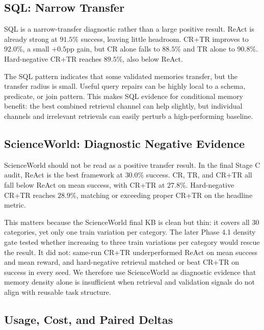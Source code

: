 \subsection{SQL: Narrow Transfer}
\label{sec:results-sql}

SQL is a narrow-transfer diagnostic rather than a large positive result.
ReAct is already strong at $91.5\%$ success, leaving little headroom.
CR+TR improves to $92.0\%$, a small $+0.5$pp gain, but CR alone falls to $88.5\%$ and TR alone to $90.8\%$.
Hard-negative CR+TR reaches $89.5\%$, also below ReAct.

The SQL pattern indicates that some validated memories transfer, but the transfer radius is small.
Useful query repairs can be highly local to a schema, predicate, or join pattern.
This makes SQL evidence for conditional memory benefit: the best combined retrieval channel can help slightly, but individual channels and irrelevant retrievals can easily perturb a high-performing baseline.

\subsection{ScienceWorld: Diagnostic Negative Evidence}
\label{sec:results-scienceworld}

ScienceWorld should not be read as a positive transfer result.
In the final Stage C audit, ReAct is the best framework at $30.0\%$ success.
CR, TR, and CR+TR all fall below ReAct on mean success, with CR+TR at $27.8\%$.
Hard-negative CR+TR reaches $28.9\%$, matching or exceeding proper CR+TR on the headline metric.

This matters because the ScienceWorld final KB is clean but thin: it covers all 30 categories, yet only one train variation per category.
The later Phase 4.1 density gate tested whether increasing to three train variations per category would rescue the result.
It did not: same-run CR+TR underperformed ReAct on mean success and mean reward, and hard-negative retrieval matched or beat CR+TR on success in every seed.
We therefore use ScienceWorld as diagnostic evidence that memory density alone is insufficient when retrieval and validation signals do not align with reusable task structure.

\subsection{Usage, Cost, and Paired Deltas}
\label{sec:usage-deltas}




